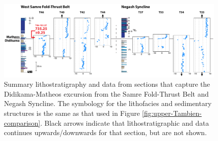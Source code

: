 \begin{figure}[h!]
\begin{center}
	\includegraphics[width=\textwidth]{figures/Tambien/Didikama-Matheos-sections.pdf}
	\caption[Lithostratigraphy and \dC data from sections that capture the Didikama-Matheos excursion.]{Summary lithostratigraphy and \dC data from sections that capture the Didikama-Matheos excursion from the Samre Fold-Thrust Belt and Negash Syncline. The symbology for the lithofacies and sedimentary structures is the same as that used in Figure \ref{fig:upper-Tambien-comparison}. Black arrows indicate that lithostratigraphic and \dC data continues upwards/downwards for that section, but are not shown.}
	\label{fig:Didikama-Matheos-sections}
\end{center}
\end{figure}

